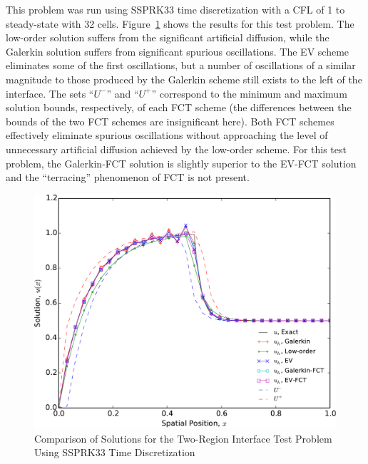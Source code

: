 This problem was run using SSPRK33 time discretization with a CFL of 1 to
steady-state with 32 cells. Figure~\ref{fig:interface} shows the results
for this test problem. The low-order solution suffers from the significant
artificial diffusion, while the Galerkin solution suffers from significant
spurious oscillations. The EV scheme eliminates some of the first oscillations,
but a number of oscillations of a similar magnitude to those produced by
the Galerkin scheme still exists to the left of the interface.
The sets ``$U^-$'' and ``$U^+$'' correspond to the minimum and maximum solution
bounds, respectively, of each FCT scheme (the differences between the bounds of the two FCT 
schemes are insignificant here).
Both FCT schemes effectively eliminate spurious oscillations without approaching
the level of unnecessary artificial diffusion achieved by the low-order
scheme. For this test problem, the Galerkin-FCT solution is slightly
superior to the EV-FCT solution and the ``terracing'' phenomenon
of FCT is not present.

\begin{figure}[htb]
   \centering
      \includegraphics[width=\textwidth]
        {images/solution_interface.pdf}
      \caption{Comparison of Solutions for the Two-Region Interface Test
       Problem Using SSPRK33 Time Discretization}
   \label{fig:interface}
\end{figure}
\clearpage
